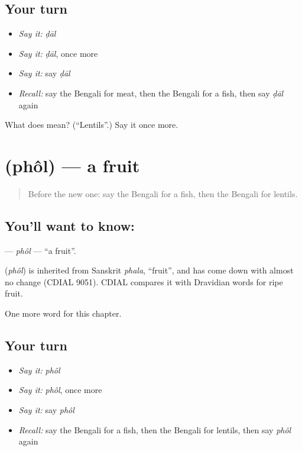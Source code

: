\subsection*{Your turn}
\begin{itemize}
\raggedright
  \item \emph{Say it:} \emph{ḍāl}
  \item \emph{Say it:} \emph{ḍāl}, once more
  \item \emph{Say it:} say \emph{ḍāl}
  \item \emph{Recall:} say the Bengali for meat, then the Bengali for a fish, then say \emph{ḍāl} again
\end{itemize}

\begin{tcolorbox}[breakable,colback=teal!4,colframe=teal!35!black,title={Before you move on}]
What does  mean? (\textquotedblleft{}Lentils\textquotedblright{}.) Say it once more.
\end{tcolorbox}
\section[\texorpdfstring{\bn{ফল} (phôl)}{ফল (phôl)}]{ (phôl) — a fruit}

\label{lesson:BN-C56-phol}



\begin{quote}
Before the new one: say the Bengali for a fish, then the Bengali for lentils.
\end{quote}

\subsection*{You'll want to know: }
\textbf{} — \emph{phôl} — \textquotedblleft{}a fruit\textquotedblright{}.

\begin{cousinweb}
\textbf{} (\emph{phôl}) is inherited from Sanskrit \emph{phala}, \textquotedblleft{}fruit\textquotedblright{}, and has come down with almost no change (CDIAL 9051). CDIAL compares it with Dravidian words for ripe fruit.
\end{cousinweb}

\begin{grammarlens}[title={What you've built}]
One more word for this chapter.
\end{grammarlens}

\subsection*{Your turn}
\begin{itemize}
\raggedright
  \item \emph{Say it:} \emph{phôl}
  \item \emph{Say it:} \emph{phôl}, once more
  \item \emph{Say it:} say \emph{phôl}
  \item \emph{Recall:} say the Bengali for a fish, then the Bengali for lentils, then say \emph{phôl} again
\end{itemize}

